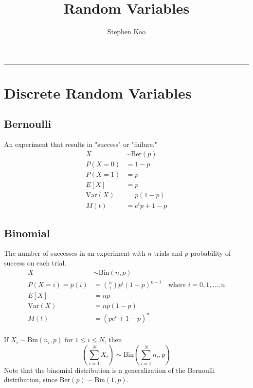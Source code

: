 \documentclass[12pt]{article}
\title{Random Variables}
\author{Stephen Koo}
\newcommand{\Sp}{\text{ }}
\newcommand{\Var}{\text{Var}}
\newcommand{\Bin}{\text{Bin}}
\newcommand{\Where}{\Sp\text{ where }}
\begin{document}
\maketitle
\vspace{-0.3in}
\rule{\linewidth}{0.4pt}

\section{Discrete Random Variables}
\subsection{Bernoulli}
An experiment that results in "success" or "failure."
\begin{align*}
    X& \sim \text{Ber}(p) \\
    P(X = 0)& = 1 - p \\
    P(X = 1)& = p \\
        E[X]& = p \\
     \Var(X)& = p(1-p) \\
        M(t)& = e^t p + 1 - p
\end{align*}

\subsection{Binomial}
The number of successes in an experiment with $n$ trials and $p$ probability of success on each trial.
\begin{align*}
    X& \sim \Bin(n,p) \\
    P(X = i) = p(i)& = \binom{n}{i} p^i (1-p)^{n-i} \Where i = 0,1,\ldots, n\\
               E[X]& = np \\
            \Var(X)& = np(1-p) \\
               M(t)& = (pe^t + 1 - p)^n
\end{align*}
\\
If $X_i \sim \Bin(n_i, p)$ for $1 \leq i \leq N$, then
\[
    \left( \sum_{i=1}^N X_i \right) \sim \Bin\left(\sum_{i=1}^N n_i, p \right)
\]
Note that the binomial distribution is a generalization of the Bernoulli distribution, since $\text{Ber}(p) \sim \Bin(1, p)$.
\end{document}
